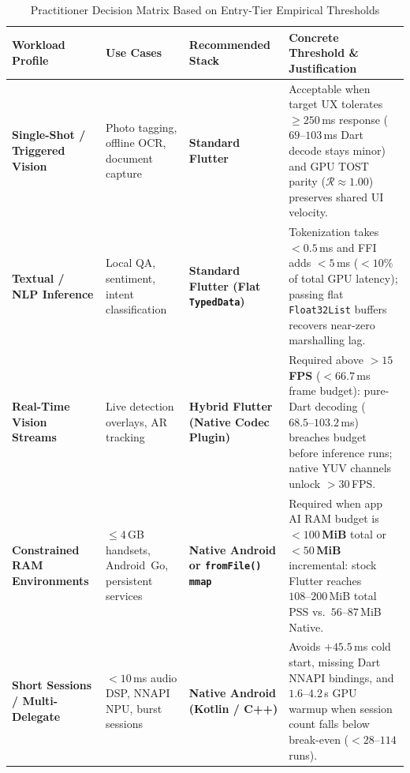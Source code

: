 \begin{table}[t]
\caption{Practitioner Decision Matrix Based on Entry-Tier Empirical Thresholds}
\label{tab:guidelines}
\centering
\begin{tabular}{>{\raggedright\arraybackslash}p{3.3cm}>{\raggedright\arraybackslash}p{3.2cm}>{\raggedright\arraybackslash}p{3.8cm}>{\raggedright\arraybackslash}p{5.2cm}}
\toprule
\textbf{Workload Profile} & \textbf{Use Cases} & \textbf{Recommended Stack} & \textbf{Concrete Threshold \& Justification} \\
\midrule
\textbf{Single-Shot / Triggered Vision} & Photo tagging, offline OCR, document capture & \textbf{Standard Flutter} & Acceptable when target UX tolerates $\ge 250$\,ms response ($69\text{--}103$\,ms Dart decode stays minor) and GPU TOST parity ($\mathcal{R} \approx 1.00$) preserves shared UI velocity. \\
\addlinespace
\textbf{Textual / NLP Inference} & Local QA, sentiment, intent classification & \textbf{Standard Flutter (Flat \texttt{TypedData})} & Tokenization takes $<0.5$\,ms and FFI adds $<5$\,ms ($<10\%$ of total GPU latency); passing flat \texttt{Float32List} buffers recovers near-zero marshalling lag. \\
\addlinespace
\textbf{Real-Time Vision Streams} & Live detection overlays, AR tracking & \textbf{Hybrid Flutter (Native Codec Plugin)} & Required above \textbf{$>15$\,FPS} ($<66.7$\,ms frame budget): pure-Dart decoding ($68.5\text{--}103.2$\,ms) breaches budget before inference runs; native YUV channels unlock $>30$\,FPS. \\
\addlinespace
\textbf{Constrained RAM Environments} & $\le 4$\,GB handsets, Android~Go, persistent services & \textbf{Native Android or \texttt{fromFile()} \texttt{mmap}} & Required when app AI RAM budget is \textbf{$<100$\,MiB} total or \textbf{$<50$\,MiB} incremental: stock Flutter reaches $108\text{--}200$\,MiB total PSS vs.\ $56\text{--}87$\,MiB Native. \\
\addlinespace
\textbf{Short Sessions / Multi-Delegate} & $<10$\,ms audio DSP, NNAPI NPU, burst sessions & \textbf{Native Android (Kotlin / C++)} & Avoids $+45.5$\,ms cold start, missing Dart NNAPI bindings, and $1.6\text{--}4.2$\,s GPU warmup when session count falls below break-even ($<28\text{--}114$ runs). \\
\bottomrule
\end{tabular}
\end{table}
